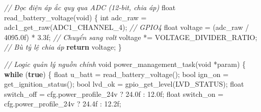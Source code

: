 \documentclass[a4paper]{extarticle}
\newenvironment{Shaded}{}{}
\newcommand{\BuiltInTok}[1]{\textcolor[rgb]{0.00,0.50,0.00}{#1}}
\newcommand{\CommentTok}[1]{\textcolor[rgb]{0.38,0.63,0.69}{\textit{#1}}}
\newcommand{\ControlFlowTok}[1]{\textcolor[rgb]{0.00,0.44,0.13}{\textbf{#1}}}
\newcommand{\DataTypeTok}[1]{\textcolor[rgb]{0.56,0.13,0.00}{#1}}
\newcommand{\FloatTok}[1]{\textcolor[rgb]{0.25,0.63,0.44}{#1}}
\newcommand{\KeywordTok}[1]{\textcolor[rgb]{0.00,0.44,0.13}{\textbf{#1}}}
\newcommand{\NormalTok}[1]{#1}
\newcommand{\OperatorTok}[1]{\textcolor[rgb]{0.40,0.40,0.40}{#1}}
\begin{document}
\begin{Shaded}
\begin{Highlighting}[]
\CommentTok{// Đọc điện áp ắc quy qua ADC (12{-}bit, chia áp)}
\DataTypeTok{float}\NormalTok{ read\_battery\_voltage}\OperatorTok{(}\DataTypeTok{void}\OperatorTok{)}
\OperatorTok{\{}
    \DataTypeTok{int}\NormalTok{ adc\_raw }\OperatorTok{=}\NormalTok{ adc1\_get\_raw}\OperatorTok{(}\NormalTok{ADC1\_CHANNEL\_4}\OperatorTok{);}  \CommentTok{// GPIO4}
    \DataTypeTok{float}\NormalTok{ voltage }\OperatorTok{=} \OperatorTok{(}\NormalTok{adc\_raw }\OperatorTok{/} \FloatTok{4095.0}\BuiltInTok{f}\OperatorTok{)} \OperatorTok{*} \FloatTok{3.3}\BuiltInTok{f}\OperatorTok{;}  \CommentTok{// Chuyển sang volt}
\NormalTok{    voltage }\OperatorTok{*=}\NormalTok{ VOLTAGE\_DIVIDER\_RATIO}\OperatorTok{;}              \CommentTok{// Bù tỷ lệ chia áp}
    \ControlFlowTok{return}\NormalTok{ voltage}\OperatorTok{;}
\OperatorTok{\}}

\CommentTok{// Logic quản lý nguồn chính}
\DataTypeTok{void}\NormalTok{ power\_management\_task}\OperatorTok{(}\DataTypeTok{void} \OperatorTok{*}\NormalTok{param}\OperatorTok{)}
\OperatorTok{\{}
    \ControlFlowTok{while} \OperatorTok{(}\KeywordTok{true}\OperatorTok{)} \OperatorTok{\{}
        \DataTypeTok{float}\NormalTok{ u\_batt }\OperatorTok{=}\NormalTok{ read\_battery\_voltage}\OperatorTok{();}
        \DataTypeTok{bool}\NormalTok{ ign\_on  }\OperatorTok{=}\NormalTok{ get\_ignition\_status}\OperatorTok{();}
        \DataTypeTok{bool}\NormalTok{ lvd\_ok  }\OperatorTok{=}\NormalTok{ gpio\_get\_level}\OperatorTok{(}\NormalTok{LVD\_STATUS}\OperatorTok{);}
        \DataTypeTok{float}\NormalTok{ switch\_off }\OperatorTok{=}\NormalTok{ cfg}\OperatorTok{.}\NormalTok{power\_profile\_24v }\OperatorTok{?} \FloatTok{24.0}\BuiltInTok{f} \OperatorTok{:} \FloatTok{12.0}\BuiltInTok{f}\OperatorTok{;}
        \DataTypeTok{float}\NormalTok{ switch\_on  }\OperatorTok{=}\NormalTok{ cfg}\OperatorTok{.}\NormalTok{power\_profile\_24v }\OperatorTok{?} \FloatTok{24.4}\BuiltInTok{f} \OperatorTok{:} \FloatTok{12.2}\BuiltInTok{f}\OperatorTok{;}


\end{Highlighting}
\end{Shaded}
\end{document}
